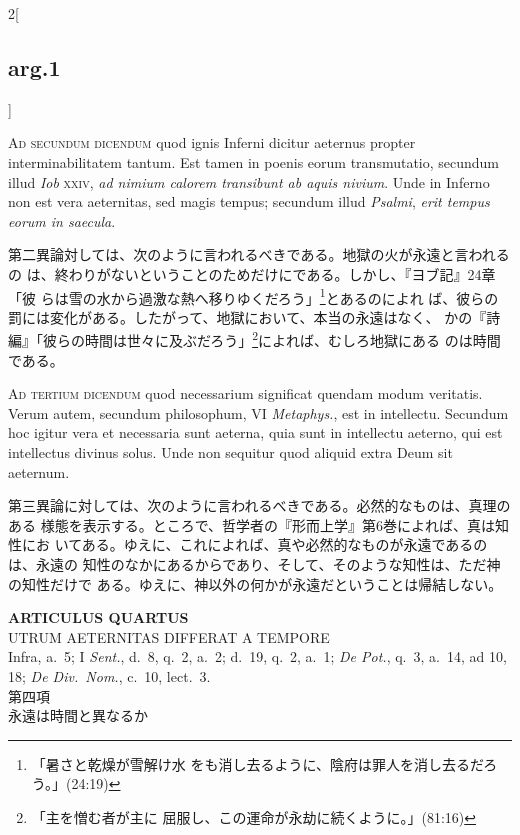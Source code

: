 \documentclass[paper=a4paper,fontsize=10pt,jafontsize=9pt,titlepage]{jlreq}
\begin{document}
\begin{paracol}{2}[\subsection{arg.1}]
\switchcolumn*[\subsection{ad.2}]

{\scshape Ad secundum dicendum} quod ignis Inferni dicitur aeternus
propter interminabilitatem tantum. Est tamen in poenis eorum
transmutatio, secundum illud {\itshape Iob} {\scshape xxiv}, {\itshape ad nimium
calorem transibunt ab aquis nivium}. Unde in Inferno non est vera
aeternitas, sed magis tempus; secundum illud {\itshape Psalmi}, {\itshape erit tempus
eorum in saecula}.

\switchcolumn

第二異論対しては、次のように言われるべきである。地獄の火が永遠と言われるの
は、終わりがないということのためだけにである。しかし、『ヨブ記』24章「彼
らは雪の水から過激な熱へ移りゆくだろう」\footnote{「暑さと乾燥が雪解け水
をも消し去るように、陰府は罪人を消し去るだろう。」(24:19)}とあるのによれ
ば、彼らの罰には変化がある。したがって、地獄において、本当の永遠はなく、
かの『詩編』「彼らの時間は世々に及ぶだろう」\footnote{「主を憎む者が主に
屈服し、この運命が永劫に続くように。」(81:16)}によれば、むしろ地獄にある
のは時間である。

\switchcolumn*[\subsection{ad.3}]

{\scshape Ad tertium dicendum} quod necessarium significat quendam modum
veritatis. Verum autem, secundum philosophum, VI {\itshape Metaphys.}, est in
intellectu. Secundum hoc igitur vera et necessaria sunt aeterna, quia
sunt in intellectu aeterno, qui est intellectus divinus solus. Unde non
sequitur quod aliquid extra Deum sit aeternum.

\switchcolumn

第三異論に対しては、次のように言われるべきである。必然的なものは、真理のある
様態を表示する。ところで、哲学者の『形而上学』第6巻によれば、真は知性にお
いてある。ゆえに、これによれば、真や必然的なものが永遠であるのは、永遠の
知性のなかにあるからであり、そして、そのような知性は、ただ神の知性だけで
ある。ゆえに、神以外の何かが永遠だということは帰結しない。

\end{paracol}

\newpage
{}

\begin{center}
 {\Large {\bfseries ARTICULUS QUARTUS}}\\
 {\large UTRUM AETERNITAS DIFFERAT A TEMPORE}\\
 {\footnotesize Infra, a.~5; I {\itshape Sent.}, d.~8, q.~2, a.~2;
 d.~19, q.~2, a.~1; {\itshape De Pot.}, q.~3, a.~14, ad 10, 18;
 {\itshape De Div.~Nom.}, c.~10, lect.~3.}\\
 {\Large 第四項\\永遠は時間と異なるか}
\end{center}
\end{document}
